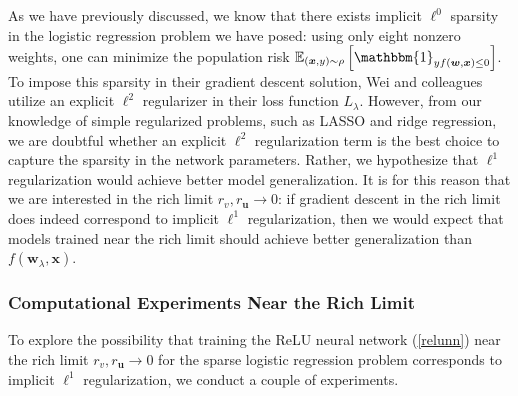 \documentclass{article}
\begin{document}
As we have previously discussed, we know that there exists implicit $\ell^0$ sparsity in the logistic regression problem we have posed: using only eight nonzero weights, one can minimize the population risk $\mathbb{E}_{(\boldsymbol{x}, y) \sim \rho} \left[ \mathbbm{1}_{y f(\boldsymbol{w}, \boldsymbol{x}) \leq 0} \right]$. To impose this sparsity in their gradient descent solution, Wei and colleagues utilize an explicit $\ell^2$ regularizer in their loss function $L_{\lambda}$. However, from our knowledge of simple regularized problems, such as LASSO and ridge regression, we are doubtful whether an explicit $\ell^2$ regularization term is the best choice to capture the sparsity in the network parameters. Rather, we hypothesize that $\ell^1$ regularization would achieve better model generalization. It is for this reason that we are interested in the rich limit $r_v, r_{\boldsymbol{u}} \rightarrow 0$: if gradient descent in the rich limit does indeed correspond to implicit $\ell^1$ regularization, then we would expect that models trained near the rich limit should achieve better generalization than $f(\boldsymbol{w}_{\lambda}, \boldsymbol{x})$.

\subsubsection{Computational Experiments Near the Rich Limit}

To explore the possibility that training the ReLU neural network (\ref{relunn}) near the rich limit $r_v, r_{\boldsymbol{u}} \rightarrow 0$ for the sparse logistic regression problem corresponds to implicit $\ell^1$ regularization, we conduct a couple of experiments.
\end{document}
